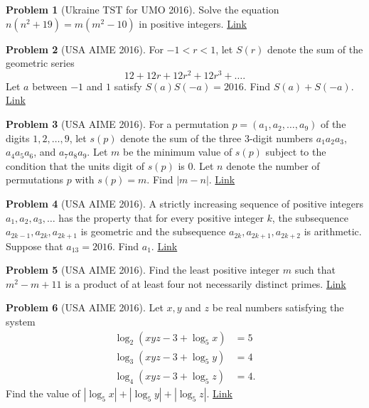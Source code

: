 \documentclass[]{article}
\theoremstyle{definition}
\newtheorem{problem}{Problem}
\begin{document}
\begin{problem}[Ukraine TST for UMO 2016]
	Solve the equation $n(n^2+19)=m(m^2-10)$ in positive integers. \hfill \href{http://artofproblemsolving.com/community/c6h1202161p5914918}{Link}
\end{problem}



\begin{problem}[USA AIME 2016]
	For $-1 < r < 1$, let $S(r)$ denote the sum of the geometric series \[12 + 12r + 12r^2 + 12r^3 + \ldots.\]Let $a$ between $-1$ and $1$ satisfy $S(a)S(-a)=2016$. Find $S(a) + S(-a)$. \hfill \href{http://artofproblemsolving.com/community/c5h1207186p5966121}{Link}
\end{problem}

\begin{problem}[USA AIME 2016]
	For a permutation $p = (a_1,a_2,\ldots,a_9)$ of the digits $1,2,\ldots,9$, let $s(p)$ denote the sum of the three $3$-digit numbers $a_1a_2a_3$, $a_4a_5a_6$, and $a_7a_8a_9$. Let $m$ be the minimum value of $s(p)$ subject to the condition that the units digit of $s(p)$ is $0$. Let $n$ denote the number of permutations $p$ with $s(p) = m$. Find $|m - n|$. \hfill \href{http://artofproblemsolving.com/community/c5h1207194p5966150}{Link}
\end{problem}



\begin{problem}[USA AIME 2016]
	A strictly increasing sequence of positive integers $a_1, a_2, a_3, \ldots$ has the property that for every positive integer $k$, the subsequence $a_{2k-1}, a_{2k}, a_{2k+1}$ is geometric and the subsequence $a_{2k}, a_{2k+1}, a_{2k+2}$ is arithmetic. Suppose that $a_{13} = 2016$. Find $a_1$. \hfill \href{http://artofproblemsolving.com/community/c5h1207204p5966186}{Link}
\end{problem}



\begin{problem}[USA AIME 2016]
	Find the least positive integer $m$ such that $m^2 - m + 11$ is a product of at least four not necessarily distinct primes. \hfill \href{http://artofproblemsolving.com/community/c5h1207207p5966196}{Link}
\end{problem}



\begin{problem}[USA AIME 2016]
	Let $x,y$ and $z$ be real numbers satisfying the system \begin{align*} \log_2(xyz-3+\log_5 x) &= 5 \\ \log_3(xyz-3+\log_5 y) &= 4 \\ \log_4(xyz-3+\log_5 z) &= 4. \end{align*}Find the value of $|\log_5 x|+|\log_5 y|+|\log_5 z|$. \hfill \href{http://artofproblemsolving.com/community/c5h1213121p6023524}{Link}
\end{problem}
\end{document}

